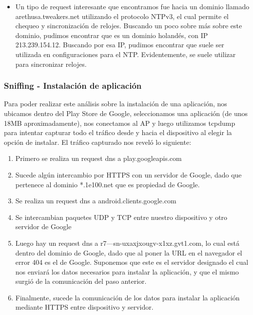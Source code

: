\begin{itemize}
\begin{lstlisting}[language=bash]
  16:15:09.755357 IP 10.0.0.168.48568 > kali.domain: 45520+ A? Outlookmobile-office365-tas.msedge.net
  16:15:09.768672 IP kali.domain > 10.0.0.168.48568: 45520 3/2/2 CNAME outlookmobile-office365-tas-msedge-net.e-0009.e-msedge.net., CNAME e-0009.e-msedge.net., A 13.107.5.88 (223)
  16:15:12.203729 IP 10.0.0.168.53945 > kali.domain: 55377+ A? Mobile.pipe.aria.microsoft.com
  16:15:12.216609 IP kali.domain > 10.0.0.168.53945: 55377 5/10/5 CNAME prd.col.aria.mobile.skypedata.akadns.net., CNAME pipe.skype.com., CNAME pipe.prd.skypedata.akadns.net., CNAME pipe.cloudapp.aria.akadns.net., A 40.117.100.83 (504)
\end{lstlisting}

\item Un tipo de request interesante que encontramos fue hacia un dominio llamado arethusa.tweakers.net utilizando el protocolo NTPv3, el cual 
permite el chequeo y sincronización de relojes. Buscando un poco sobre más sobre este dominio, pudimos encontrar que es un dominio holandés, 
con IP 213.239.154.12. Buscando por esa IP, pudimos encontrar que suele ser utilizada en configuraciones para el NTP. Evidentemente, se 
suele utilizar para sincronizar relojes.

\end{itemize}

\subsubsection{Sniffing - Instalación de aplicación}

Para poder realizar este análisis sobre la instalación de una aplicación, nos ubicamos dentro del Play Store de Google, seleccionamos una 
aplicación (de unos 18MB aproximadamente), nos conectamos al AP y luego utilizamos tcpdump para intentar capturar todo el tráfico desde 
y hacia el dispositivo al elegir la opción de instalar. El tráfico capturado nos reveló lo siguiente:

\begin{enumerate}
  \item Primero se realiza un request dns a play.googleapis.com
  \item Sucede algún intercambio por HTTPS con un servidor de Google, dado que pertenece al dominio *.1e100.net que es propiedad de Google.
  \item Se realiza un request dns a android.clients.google.com
  \item Se intercambian paquetes UDP y TCP entre nuestro dispositivo y otro servidor de Google
  \item Luego hay un request dns a r7---sn-uxaxjxougv-x1xz.gvt1.com, lo cual está dentro del dominio de Google, dado que al poner la URL 
  en el navegador el error 404 es el de Google. Suponemos que este es el servidor designado el cual nos enviará los datos necesarios para 
  instalar la aplicación, y que el mismo surgió de la comunicación del paso anterior.
  \item Finalmente, sucede la comunicación de los datos para instalar la aplicación mediante HTTPS entre dispositivo y servidor. 
\end{enumerate}


